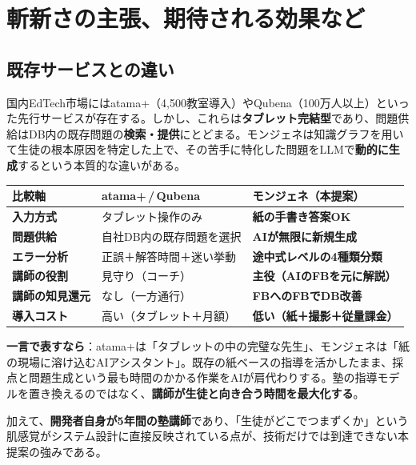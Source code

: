 \documentclass[paper=a4,fontsize=10.5bp,jafontsize=10.5bp,twocolumn]{jlreq}
\begin{document}
\section{斬新さの主張、期待される効果など}

\subsection{既存サービスとの違い}

国内EdTech市場にはatama+（4,500教室導入）やQubena（100万人以上）といった先行サービスが存在する。しかし、これらは\textbf{タブレット完結型}であり、問題供給はDB内の既存問題の\textbf{検索・提供}にとどまる。モンジェネは知識グラフを用いて生徒の根本原因を特定した上で、その苦手に特化した問題をLLMで\textbf{動的に生成}するという本質的な違いがある。

\begin{scriptsize}\noindent
\begin{tabularx}{\linewidth}{>{\bfseries}l X X}
\toprule
比較軸 & atama+\,/\,Qubena & モンジェネ（本提案） \\
\midrule
入力方式 & タブレット操作のみ & \textbf{紙の手書き答案OK} \\
問題供給 & 自社DB内の既存問題を選択 & \textbf{AIが無限に新規生成} \\
エラー分析 & 正誤＋解答時間＋迷い挙動 & \textbf{途中式レベルの4種類分類} \\
講師の役割 & 見守り（コーチ） & \textbf{主役（AIのFBを元に解説）} \\
講師の知見還元 & なし（一方通行） & \textbf{FBへのFBでDB改善} \\
導入コスト & 高い（タブレット＋月額） & \textbf{低い（紙＋撮影＋従量課金）} \\
\bottomrule
\end{tabularx}
\end{scriptsize}

\begin{highlightbox}
\textbf{一言で表すなら}：atama+は「タブレットの中の完璧な先生」、モンジェネは「紙の現場に溶け込むAIアシスタント」。既存の紙ベースの指導を活かしたまま、採点と問題生成という最も時間のかかる作業をAIが肩代わりする。塾の指導モデルを置き換えるのではなく、\textbf{講師が生徒と向き合う時間を最大化する}。
\end{highlightbox}

\noindent
加えて、\textbf{開発者自身が5年間の塾講師}であり、「生徒がどこでつまずくか」という肌感覚がシステム設計に直接反映されている点が、技術だけでは到達できない本提案の強みである。
\end{document}
